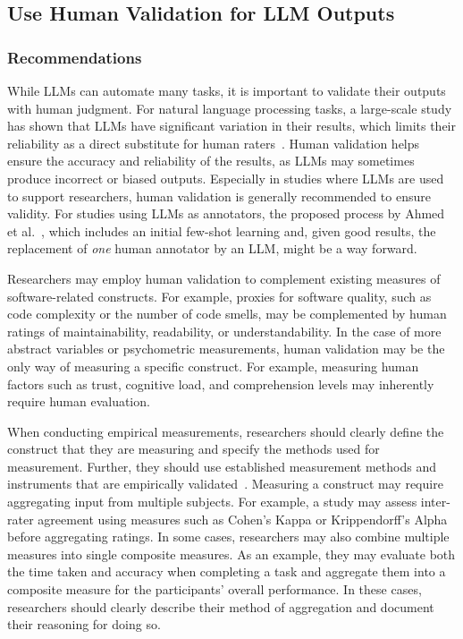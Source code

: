 



\subsection{Use Human Validation for LLM Outputs}

\subsubsection{Recommendations}

While LLMs can automate many tasks, it is important to validate their outputs with human judgment.
For natural language processing tasks, a large-scale study has shown that LLMs have significant variation in their results, which limits their reliability as a direct substitute for human raters~\cite{DBLP:journals/corr/abs-2406-18403}. 
Human validation helps ensure the accuracy and reliability of the results, as LLMs may sometimes produce incorrect or biased outputs.
Especially in studies where LLMs are used to support researchers, human validation is generally recommended to ensure validity.
For studies using LLMs as annotators, the proposed process by Ahmed et al.~\cite{DBLP:journals/corr/abs-2408-05534}, which includes an initial few-shot learning and, given good results, the replacement of \emph{one} human annotator by an LLM, might be a way forward.

Researchers may employ human validation to complement existing measures of software-related constructs.
For example, proxies for software quality, such as code complexity or the number of code smells, may be complemented by human ratings of maintainability, readability, or understandability.
In the case of more abstract variables or psychometric measurements, human validation may be the only way of measuring a specific construct.
For example, measuring human factors such as trust, cognitive load, and comprehension levels may inherently require human evaluation.

When conducting empirical measurements, researchers should clearly define the construct that they are measuring and specify the methods used for measurement.
Further, they should use established measurement methods and instruments that are empirically validated~\cite{DBLP:journals/fcomp/HoffmanMKL23, DBLP:conf/chi/PerrigSB23}.
Measuring a construct may require aggregating input from multiple subjects. 
For example, a study may assess inter-rater agreement using measures such as Cohen's Kappa or Krippendorff’s Alpha before aggregating ratings.
In some cases, researchers may also combine multiple measures into single composite measures.
As an example, they may evaluate both the time taken and accuracy when completing a task and aggregate them into a composite measure for the participants' overall performance.
In these cases, researchers should clearly describe their method of aggregation and document their reasoning for doing so.

